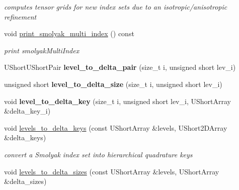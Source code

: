 \begin{DoxyCompactItemize}
\begin{DoxyCompactList}\small\item\em computes tensor grids for new index sets due to an isotropic/anisotropic refinement \end{DoxyCompactList}\item 
void \hyperlink{classPecos_1_1HierarchSparseGridDriver_ae5bcc14a0e7bb726d5280c3dd10e6c98}{print\+\_\+smolyak\+\_\+multi\+\_\+index} () const \label{classPecos_1_1HierarchSparseGridDriver_ae5bcc14a0e7bb726d5280c3dd10e6c98}

\begin{DoxyCompactList}\small\item\em print smolyak\+Multi\+Index \end{DoxyCompactList}\item 
U\+Short\+U\+Short\+Pair {\bfseries level\+\_\+to\+\_\+delta\+\_\+pair} (size\+\_\+t i, unsigned short lev\+\_\+i)\label{classPecos_1_1HierarchSparseGridDriver_a848901ff3e8ea724fc2a7d114ce51ab2}

\item 
unsigned short {\bfseries level\+\_\+to\+\_\+delta\+\_\+size} (size\+\_\+t i, unsigned short lev\+\_\+i)\label{classPecos_1_1HierarchSparseGridDriver_a79cf86a8d2bf6874eb9654655c8e1236}

\item 
void {\bfseries level\+\_\+to\+\_\+delta\+\_\+key} (size\+\_\+t i, unsigned short lev\+\_\+i, U\+Short\+Array \&delta\+\_\+key\+\_\+i)\label{classPecos_1_1HierarchSparseGridDriver_ad28e1cd919d12b221e24c25a710ad91e}

\item 
void \hyperlink{classPecos_1_1HierarchSparseGridDriver_ac3ee15acadcdde2296dc77ecd10e94cb}{levels\+\_\+to\+\_\+delta\+\_\+keys} (const U\+Short\+Array \&levels, U\+Short2\+D\+Array \&delta\+\_\+keys)\label{classPecos_1_1HierarchSparseGridDriver_ac3ee15acadcdde2296dc77ecd10e94cb}

\begin{DoxyCompactList}\small\item\em convert a Smolyak index set into hierarchical quadrature keys \end{DoxyCompactList}\item 
void \hyperlink{classPecos_1_1HierarchSparseGridDriver_aa05285153ce9897c4a1815e5db24027a}{levels\+\_\+to\+\_\+delta\+\_\+sizes} (const U\+Short\+Array \&levels, U\+Short\+Array \&delta\+\_\+sizes)\label{classPecos_1_1HierarchSparseGridDriver_aa05285153ce9897c4a1815e5db24027a}


\end{DoxyCompactItemize}
